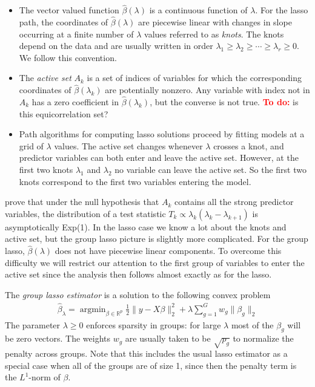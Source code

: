 \documentclass{imsart}
\newcommand{\argmin}{\mathop{\mathrm{argmin}}}
\newcommand{\todo}{\textcolor{red}{\textbf{To do: }}}
\newcommand{\real}{\mathbb{R}}
\begin{document}
\begin{itemize}

  \item The vector valued function $\hat \beta(\lambda)$ is a
    continuous function of $\lambda$. For the lasso path, the
    coordinates of $\hat \beta(\lambda)$ are piecewise linear with
    changes in slope occurring at a finite number of $\lambda$ values
    referred to as \emph{knots}. The knots depend on the data and are
    usually written in order $\lambda_1 \geq \lambda_2 \geq \cdots
    \geq \lambda_r \geq 0$. We follow this convention. 

  \item The \emph{active set} $A_k$ is a set of indices of variables
    for which the corresponding coordinates of $\hat \beta(\lambda_k)$
    are potentially nonzero. Any variable with index not in $A_k$ has
    a zero coefficient in $\hat \beta(\lambda_k)$, but the converse is
    not true. \todo{is this equicorrelation set?}
  
  \item Path algorithms for computing lasso solutions proceed by
    fitting models at a grid of $\lambda$ values. The active set
    changes whenever $\lambda$ crosses a knot, and predictor variables
    can both enter and leave the active set. However, at the first two
    knots $\lambda_1$ and $\lambda_2$ no variable can leave the active
    set. So the first two knots correspond to the first two variables
    entering the model. 

\end{itemize}

\cite{significance:lasso} prove that under the null hypothesis that $A_k$
contains all the strong predictor variables, the distribution of a
test statistic $T_k \propto \lambda_k(\lambda_k - \lambda_{k+1})$ is
asymptotically Exp(1). In the lasso case we know a lot about the knots
and active set, but the group lasso picture is slightly more
complicated. For the group lasso, $\hat \beta(\lambda)$ does not have
piecewise linear components. To overcome this difficulty we will
restrict our attention to the first group of variables to enter the
active set since the analysis then follows almost exactly as for the
lasso.


The \emph{group lasso estimator} is a solution to the following convex
problem
\begin{equation}
\begin{aligned}
\label{eq:gsoln}
\displaystyle \hat \beta_\lambda = \argmin_{\beta \in \real^p} \frac{1}{2} \| y - X \beta \|_2^2 +
   \lambda \sum_{g=1}^G w_g \| \beta_g \|_2
\end{aligned}
\end{equation}
The parameter $\lambda \geq 0$ enforces sparsity in groups: for large
$\lambda$ most of the $\beta_g$ will be zero vectors. The weights
$w_g$ are usually taken to be $\sqrt {p_g}$ to normalize the penalty
across groups.  Note that this includes the usual lasso estimator as a
special case when all of the groups are of size 1, since then the
penalty term is the $L^1$-norm of $\beta$. 
\end{document}
